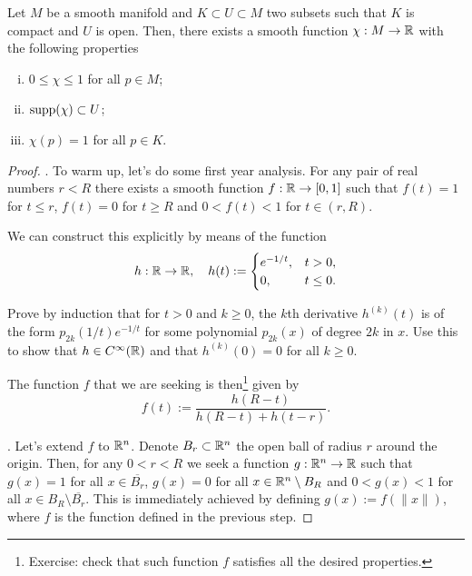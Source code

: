\begin{lemma}
	Let $M$ be a smooth manifold and $K\subset U\subset M$ two subsets such that $K$ is compact and $U$ is open.
	Then, there exists a smooth function $\chi: M \to\mathbb{R}$ with the following properties
	\begin{enumerate}[(i)]
		\item $0 \leq \chi \leq 1$ for all $p\in M$;
		\item $\operatorname{supp}(\chi)\subset U$;
		\item $\chi(p) = 1$ for all $p\in K$.
	\end{enumerate}
\end{lemma}
\begin{proof}
	.
	To warm up, let's do some first year analysis.
	For any pair of real numbers $r < R$ there exists a smooth function $f: \mathbb{R} \to [0,1]$ such that $f(t) = 1$ for $t \leq r$, $f(t) = 0$ for $t \geq R$ and $0<f(t)<1$ for $t\in(r,R)$.

	We can construct this explicitly by means of the function
	\begin{equation}
		h:\mathbb{R}\to\mathbb{R}, \quad h(t):= \begin{cases}
			e^{-1/t}, & t>0,      \\
			0,        & t \leq 0.
		\end{cases}
	\end{equation}

	\begin{exercise}
		Prove by induction that for $t>0$ and $k\geq 0$, the $k$th derivative $h^{(k)}(t)$ is of the form $p_{2k}(1/t)e^{-1/t}$ for some polynomial $p_{2k}(x)$ of degree $2k$ in $x$.
		Use this to show that $h\in C^\infty(\mathbb{R})$ and that $h^{(k)}(0) = 0$ for all $k\geq 0$.
	\end{exercise}

	The function $f$ that we are seeking is then\footnote{Exercise: check that such function $f$ satisfies all the desired properties.} given by
	\begin{equation}
		f(t) := \frac{h(R-t)}{h(R-t) + h(t-r)}.
	\end{equation}

	.
	Let's extend $f$ to $\mathbb{R}^n$.
	Denote $B_r \subset \mathbb{R}^n$ the open ball of radius $r$ around the origin.
	Then, for any $0 < r < R$ we seek a function $g:\mathbb{R}^n\to\mathbb{R}$ such that $g(x) = 1$ for all $x\in \overline{B_r}$, $g(x) = 0$ for all $x\in \mathbb{R}^n\setminus B_R$ and $0< g(x)< 1$ for all $x\in B_R\setminus\overline{B_r}$.
	This is immediately achieved by defining $g(x) := f(\|x\|)$, where $f$ is the function defined in the previous step.


\end{proof}
